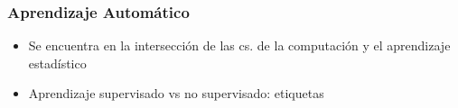 \documentclass[10pt,center]{beamer}
\begin{document}
\begin{frame}
   \frametitle{Aprendizaje Automático}
  
  \begin{itemize}
    \item Se encuentra en la intersección de las cs. de la computación y el aprendizaje estadístico
    \item Aprendizaje supervisado vs no supervisado: etiquetas 
  \end{itemize}
%  
  \begin{figure}[h]
    \begin{center}
    \end{center}
  \end{figure}  
%  
\end{frame}
\end{document}

